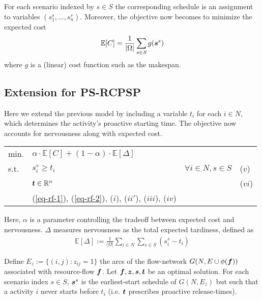   	For each scenario indexed by $s \in S$
  	the corresponding schedule is an assignment to variables $(s^s_1, \ldots, s^s_n)$.
  	Moreover, the objective now becomes to minimize the expected cost
  	\begin{align}
  		\mathbb{E}[C] = \frac{1}{|\Omega|} \sum_{s\in S} g(\boldsymbol{s}^s)
  	\end{align}
  	where $g$ is a (linear) cost function such as the makespan.
  	
  	\subsection{Extension for PS-RCPSP}
  	
  	Here we extend the previous model by including a variable $t_i$ for each $i\in N$,
  	which determines the activity's proactive starting time.
  	The objective now accounts for nervousness along with expected cost.
  	
  	\begin{center}
  	\begin{tabular}{ l l  r  l}
  	min.	&	$\alpha \cdot \mathbb{E}[C] 
  				+ (1-\alpha) \cdot \mathbb{E}[\Delta]  $		&	& \\
  	s.t.	&	$s^s_i \geq t_i$	&	$\forall i \in N, s\in S$ & ($v$) \\
  			&	$ \boldsymbol{t} \in \mathbb{R}^n$	& & ($vi$) \\
  			&	(\ref{eq-rf-1}), (\ref{eq-rf-2}), ($i$), ($ii'$), ($iii$), ($iv$)		& &	
  	\end{tabular}
  	\end{center}
  	
 	Here, $\alpha$ is a parameter controlling the tradeoff between
 	expected cost and nervousness.
 	$\Delta$ measures nervousness as the total expected tardiness, defined as
 	\begin{align}
 		\mathbb{E}[\Delta] := \frac{1}{|\Omega|} \sum_{i\in N} \sum_{s \in S} (s^s_i - t_i)
 	\end{align}
 
 	\begin{proposition}
 	\label{pro-1}

 	Define $E_z := \{(i,j) : z_{ij} = 1\}$ the arcs of the flow-network
 	$G(N, E \cup \phi(\boldsymbol{f}))$ associated with resource-flow $\boldsymbol{f}$.
 	Let $\boldsymbol{f}, \boldsymbol{z}, \boldsymbol{s}, \boldsymbol{t}$ be an optimal solution.
 	For each scenario index $s \in S$,
 	$\boldsymbol{s}^s$ is the earliest-start schedule of $G(N, E_z)$ but such that
 	a activity $i$ never starts before $t_i$
 	(i.e. $\boldsymbol{t}$ prescribes proactive release-times).
  	\end{proposition}
 	
